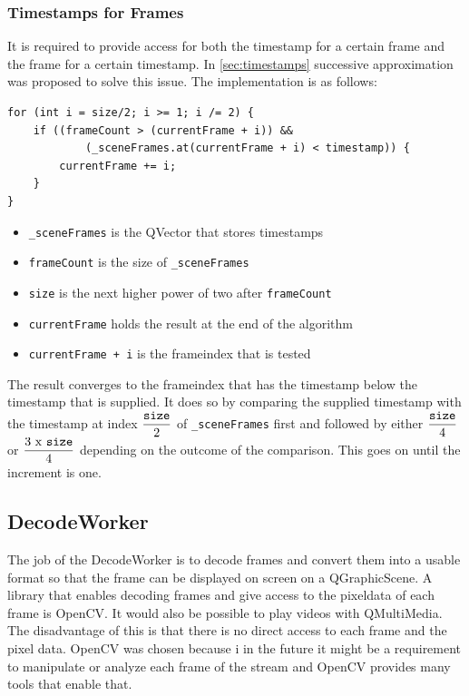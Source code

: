 \subsubsection{Timestamps for Frames}
\label{sec:timestampsForFrames}
It is required to provide access for both the timestamp for a certain frame and the frame for a certain timestamp. In \ref{sec:timestamps} successive approximation was proposed to solve this issue. The implementation is as follows:

\begin{lstlisting}
for (int i = size/2; i >= 1; i /= 2) {
	if ((frameCount > (currentFrame + i)) &&
		    (_sceneFrames.at(currentFrame + i) < timestamp)) {
		currentFrame += i;
	}
}
\end{lstlisting}
\begin{itemize}
	\item \texttt{\_sceneFrames} is the QVector that stores timestamps
	\item \texttt{frameCount} is the size of \texttt{\_sceneFrames}
	\item \texttt{size} is the next higher power of two after \texttt{frameCount}
	\item \texttt{currentFrame} holds the result at the end of the algorithm
	\item \texttt{currentFrame +  i} is the frameindex that is tested
\end{itemize}
The result converges to the frameindex that has the timestamp below the timestamp that is supplied. It does so by comparing the supplied timestamp with the timestamp at index $\displaystyle\frac{\mbox{\texttt{size}}}{\mbox{2}}$ of \texttt{\_sceneFrames} first and followed by either $\displaystyle\frac{\mbox{\texttt{size}}}{\mbox{4}}$ or $\displaystyle\frac{\mbox{3 x \texttt{size}}}{\mbox{4}}$ depending on the outcome of the comparison. This goes on until the increment is one.

\subsection{DecodeWorker}
\label{sec:decodeWorker}
The job of the DecodeWorker is to decode frames and convert them into a usable format so that the frame can be displayed on screen on a QGraphicScene. A library that enables decoding frames and give access to the pixeldata of each frame is OpenCV. It would also be possible to play videos with QMultiMedia. The disadvantage of this is that there is no direct access to each frame and the pixel data. OpenCV was chosen because i in the future it might be a requirement to manipulate or analyze each frame of the stream and OpenCV provides many tools that enable that.

